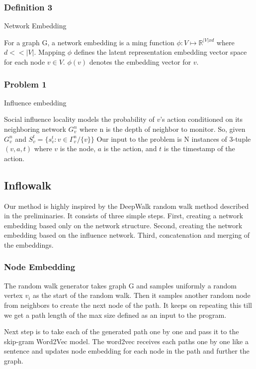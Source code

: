 \subsubsection{Definition 3} Network Embedding

For a graph G, a network embedding is a ming function $\phi : V \mapsto \mathbb{R}^{|V|xd}$ where $d << |V|$. Mapping $\phi$ defines the latent representation embedding vector space for each node $v \in V$. $\phi(v)$ denotes the embedding vector for $v$.

\subsubsection{Problem 1} Influence embedding \cite{zhang2013social}

Social influence locality models the probability of $v$'s action conditioned on its neighboring network $G^n_v$ where n is the depth of neighbor to monitor. So, given $G_v^n$ and $S_v^t = \{s^t_v : v \in \Gamma_v^n / \{v\} \}$
Our input to the problem is N instances of 3-tuple $(v, a, t)$ where $v$ is the node, $a$ is the action, and $t$ is the timestamp of the action.


\subsection{Inflowalk}

Our method is highly inspired by the DeepWalk \cite{perozzi2014deepwalk} random walk method described in the preliminaries. It consists of three simple steps. First, creating a network embedding based only on the network structure. Second, creating the network embedding based on the influence network. Third, concatenation and merging of the embeddings.

\subsubsection{Node Embedding}

The random walk generator takes graph G  and samples uniformly a random vertex $v_i$ as the start of the random walk. Then it samples another random node from neighbors to create the next node of the path. It keeps on repeating this till we get a path length of the max size defined as an input to the program.

Next step is to take each of the generated path one by one and pass it to the skip-gram \cite{mikolov2013efficient} Word2Vec model. The word2vec receives each paths one by one like a sentence and updates node embedding for each node in the path and further the graph.


